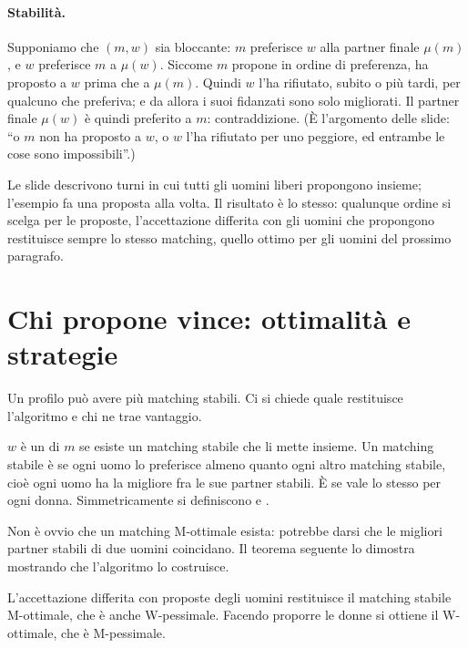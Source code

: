 \paragraph{Stabilità.} Supponiamo che $(m, w)$ sia bloccante: $m$ preferisce $w$ alla
partner finale $\mu(m)$, e $w$ preferisce $m$ a $\mu(w)$. Siccome $m$ propone in ordine di
preferenza, ha proposto a $w$ prima che a $\mu(m)$. Quindi $w$ l'ha rifiutato, subito o più
tardi, per qualcuno che preferiva; e da allora i suoi fidanzati sono solo migliorati. Il
partner finale $\mu(w)$ è quindi preferito a $m$: contraddizione. (È l'argomento delle
slide: ``o $m$ non ha proposto a $w$, o $w$ l'ha rifiutato per uno peggiore, ed entrambe le
cose sono impossibili''.)

\begin{osservazione}
Le slide descrivono turni in cui tutti gli uomini liberi propongono insieme; l'esempio fa
una proposta alla volta. Il risultato è lo stesso: qualunque ordine si scelga per le
proposte, l'accettazione differita con gli uomini che propongono restituisce sempre lo
stesso matching, quello ottimo per gli uomini del prossimo paragrafo.
\end{osservazione}

\section{Chi propone vince: ottimalità e strategie}

Un profilo può avere più matching stabili. Ci si chiede quale restituisce l'algoritmo e chi
ne trae vantaggio.

\begin{definizione}
$w$ è un  di $m$ se esiste un matching stabile che li mette insieme. Un
matching stabile è  se ogni uomo lo preferisce almeno quanto ogni altro
matching stabile, cioè ogni uomo ha la migliore fra le sue partner stabili. È
 se vale lo stesso per ogni donna. Simmetricamente si definiscono
 e .
\end{definizione}

Non è ovvio che un matching M-ottimale esista: potrebbe darsi che le migliori partner
stabili di due uomini coincidano. Il teorema seguente lo dimostra mostrando che
l'algoritmo lo costruisce.

\begin{teorema}
L'accettazione differita con proposte degli uomini restituisce il matching stabile
M-ottimale, che è anche W-pessimale. Facendo proporre le donne si ottiene il W-ottimale,
che è M-pessimale.
\end{teorema}

